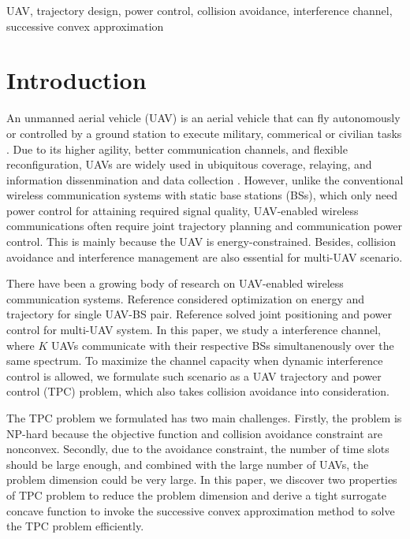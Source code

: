 \documentclass[10pt,final,conference]{IEEEtran}
\begin{document}
\begin{IEEEkeywords}
	UAV, trajectory design, power control, collision avoidance, interference channel, successive convex approximation
\end{IEEEkeywords}

\section{Introduction}\label{I}
An unmanned aerial vehicle (UAV) is an aerial vehicle that can fly autonomously or controlled by a ground station to execute military, commerical or civilian tasks \cite{IEEEexample:shen2018multi,IEEEexample:zeng2016wireless}. Due to its higher agility, better communication channels, and flexible reconfiguration, UAVs are widely used in ubiquitous coverage, relaying, and information dissenmination and data collection \cite{IEEEexample:zeng2016wireless}. However, unlike the conventional wireless communication systems with static base stations (BSs), which only need power control for attaining required signal quality, UAV-enabled wireless communications often require joint trajectory planning and communication power control. This is mainly because the UAV is energy-constrained. Besides, collision avoidance and interference management are also essential for multi-UAV scenario.

There have been a growing body of research on UAV-enabled wireless communication systems. Reference \cite{IEEEexample:7888557} considered optimization on energy and trajectory for single UAV-BS pair. Reference \cite{IEEEexample:li2019uav} solved joint positioning and power control for multi-UAV system. In this paper, we study a interference channel, where $K$ UAVs communicate with their respective BSs simultanenously over the same spectrum. To maximize the channel capacity when dynamic interference control is allowed, we formulate such scenario as a UAV trajectory and power control (TPC) problem, which also takes collision avoidance into consideration.

The TPC problem we formulated has two main challenges. Firstly, the problem is NP-hard because the objective function and collision avoidance constraint are nonconvex. Secondly, due to the avoidance constraint, the number of time slots should be large enough, and combined with the large number of UAVs, the problem dimension could be very large. In this paper, we discover two properties of TPC problem to reduce the problem dimension and derive a tight surrogate concave function to invoke the successive convex approximation method to solve the TPC problem efficiently.
\end{document}
